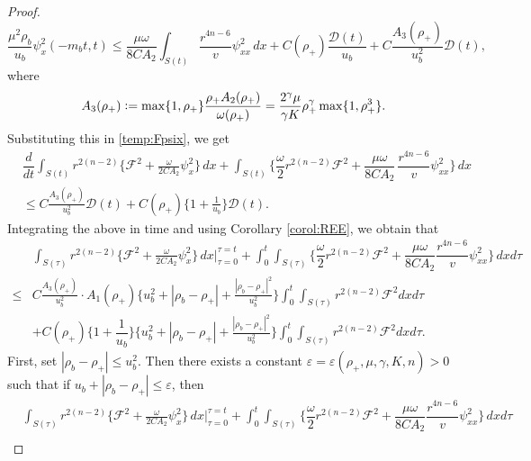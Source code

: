 \documentclass[a4paper,12pt,draft]{article}
\theoremstyle{remark}
\def\ep{\varepsilon}
\def\mD{\mathcal{D}}
\def\mF{\mathcal{F}}
\begin{document}
\begin{proof}
\begin{equation}
    \dfrac{\mu^2 \rho_b}{u_b} \psi_x^2(-m_bt,t) \le \dfrac{\mu\omega}{8C A_2}\int_{S(t)}\!\!\!\! \dfrac{r^{4n-6}}{v}\psi_{xx}^2\, dx + C(\rho_{+}) \frac{\mD(t)}{u_b} + C \frac{A_3(\rho_{+})}{u_b^2}  \mD(t) , \label{bdryPsix2}
\end{equation}
where
\begin{equation}
A_3(\rho_+) \vcentcolon= \max\{1,\rho_{+}\}  \frac{\rho_{+}A_2(\rho_{+})}{\omega(\rho_{+})} = \frac{2^\gamma \mu}{\gamma K} \rho_{+}^{\gamma} \max\{1,\rho_{+}^3\}.\label{A3} 
\end{equation}
Substituting this in \eqref{temp:Fpsix}, we get
\begin{align*}
    &\dfrac{d }{d t} \int_{S(t)}\!\! r^{2(n-2)} \Big\{ \mF^2 + \frac{\omega}{2C A_2} \psi_x^2 \Big\}\, d x  + \int_{S(t)}\!\! \Big\{ \dfrac{\omega}{2}r^{2(n-2)}\mF^2 + \dfrac{\mu\omega}{8C A_2} \dfrac{}{} \dfrac{r^{4n-6}}{v} \psi_{xx}^2 \Big\} \, d x \nonumber\\
    & \le C \frac{A_3(\rho_{+})}{u_b^2} \mD(t)  + C(\rho_{+}) \Big\{ 1+ \frac{1}{u_b} \Big\} \mD(t).
\end{align*}
Integrating the above in time and using Corollary \ref{corol:REE}, we obtain that
\begin{align*}
    &\int_{S(\tau)}\!\! r^{2(n-2)} \Big\{ \mF^2 + \frac{\omega}{2C A_2} \psi_x^2 \Big\}\, d x \bigg\vert_{\tau=0}^{\tau=t} + \int_{0}^{t}\!\!\int_{S(\tau)}\!\! \Big\{ \dfrac{\omega}{2}r^{2(n-2)}\mF^2 + \dfrac{\mu \omega}{8C A_2} \dfrac{r^{4n-6}}{v} \psi_{xx}^2 \Big\} \, d x d\tau \\
    \le& C \frac{A_3(\rho_{+})}{u_b^2} \cdot A_1(\rho_{+}) \Big\{ u_b^2 + |\rho_b-\rho_+| + \frac{|\rho_b-\rho_+|^2}{u_b^2} \Big\} \int_{0}^{t}\!\!\int_{S(\tau)} r^{2(n-2)} \mF^2 d x d \tau  \\
    &+ C(\rho_{+}) \Big\{1+ \dfrac{1}{u_b} \Big\} \Big\{ u_b^2 + |\rho_b-\rho_+| + \frac{|\rho_b-\rho_+|^2}{u_b^2} \Big\} \int_{0}^{t}\!\!\int_{S(\tau)} r^{2(n-2)} \mF^2 d x d \tau.
\end{align*}
First, set $|\rho_b-\rho_+|\le u_b^2$. Then there exists a constant $\ep=\ep(\rho_+,\mu,\gamma,K,n)>0$ such that if $u_b + |\rho_b-\rho_+|\le \ep$, then
\begin{align}
   &\int_{S(\tau)}\!\! r^{2(n-2)} \Big\{ \mF^2 + \frac{\omega}{2C A_2} \psi_x^2 \Big\}\, d x \bigg\vert_{\tau=0}^{\tau=t} + \int_{0}^{t}\!\!\int_{S(\tau)}\!\! \Big\{ \dfrac{\omega}{2}r^{2(n-2)}\mF^2 + \dfrac{\mu \omega}{8C A_2} \dfrac{r^{4n-6}}{v} \psi_{xx}^2 \Big\} \, d x d\tau \nonumber\\

\end{align}
\end{proof}
\end{document}
